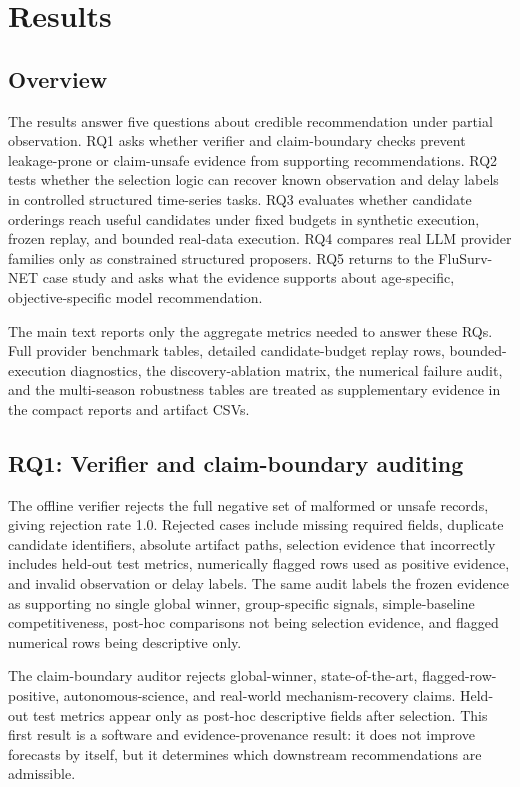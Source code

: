 \section{Results}

\subsection{Overview}

The results answer five questions about credible recommendation under partial
observation. RQ1 asks whether verifier and claim-boundary checks prevent
leakage-prone or claim-unsafe evidence from supporting recommendations. RQ2
tests whether the selection logic can recover known observation and delay
labels in controlled structured time-series tasks. RQ3 evaluates whether
candidate orderings reach useful candidates under fixed budgets in synthetic
execution, frozen replay, and bounded real-data execution. RQ4 compares real
LLM provider families only as constrained structured proposers. RQ5 returns to
the FluSurv-NET case study and asks what the evidence supports about
age-specific, objective-specific model recommendation.

The main text reports only the aggregate metrics needed to answer these RQs.
Full provider benchmark tables, detailed candidate-budget replay rows,
bounded-execution diagnostics, the discovery-ablation matrix, the numerical
failure audit, and the multi-season robustness tables are treated as
supplementary evidence in the compact reports and artifact CSVs.

\subsection{RQ1: Verifier and claim-boundary auditing}

The offline verifier rejects the full negative set of malformed or unsafe
records, giving rejection rate \num{1.0}. Rejected cases include missing
required fields, duplicate candidate identifiers, absolute artifact paths,
selection evidence that incorrectly includes held-out test metrics,
numerically flagged rows used as positive evidence, and invalid observation or
delay labels. The same audit labels the frozen evidence as supporting no
single global winner, group-specific signals, simple-baseline competitiveness,
post-hoc comparisons not being selection evidence, and flagged numerical rows
being descriptive only.

The claim-boundary auditor rejects global-winner, state-of-the-art,
flagged-row-positive, autonomous-science, and real-world mechanism-recovery
claims. Held-out test metrics appear only as post-hoc descriptive fields after
selection. This first result is a software and evidence-provenance result: it
does not improve forecasts by itself, but it determines which downstream
recommendations are admissible.

